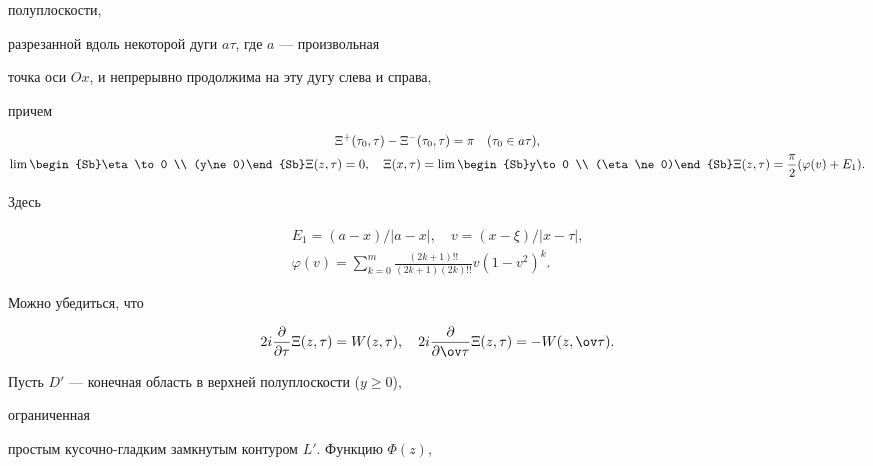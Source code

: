 полуплоскости, 


разрезанной вдоль некоторой дуги $a\tau$, где $a$ --- произвольная  


точка оси $Ox$, и непрерывно продолжима на эту дугу слева и справа, 


причем 


\begin{gather} 


\Xi^+(\tau_0,\tau)-\Xi^-(\tau_0,\tau)=\pi\quad (\tau_0\in a\tau),\\ 


\lim\begin{Sb}\eta\to 0 \\ (y\ne 0)\end{Sb}\Xi(z,\tau)=0,\quad 


\Xi(x,\tau)=\lim\begin{Sb}y\to 0 \\ (\eta\ne 0)\end{Sb} 


\Xi(z,\tau)=\frac{\pi}{2}(\varphi(v)+E_1).


\end{gather} 


Здесь 


\begin{gather*} 


E_1=(a-x)/|a-x|,\quad v=(x-\xi)/|x-\tau|,\\ 


\varphi(v)=\sum^m_{k=0} 


\frac{(2k+1)!!}{(2k+1)(2k)!!}v(1-v^2)^k. 


\end{gather*} 


 


Можно убедиться, что 


\begin{equation} 


2i\frac{\partial}{\partial\tau}\Xi(z,\tau)=W(z,\tau),\quad 


2i\frac{\partial}{\partial\ov\tau}\Xi(z,\tau)=-W(z,\ov\tau). 


\end{equation} 


 


Пусть $D'$ --- конечная область в верхней полуплоскости ($y\ge 0$), 


ограниченная 


простым кусочно-гладким замкнутым контуром $L'$. Функцию $\Phi(z)$, 


